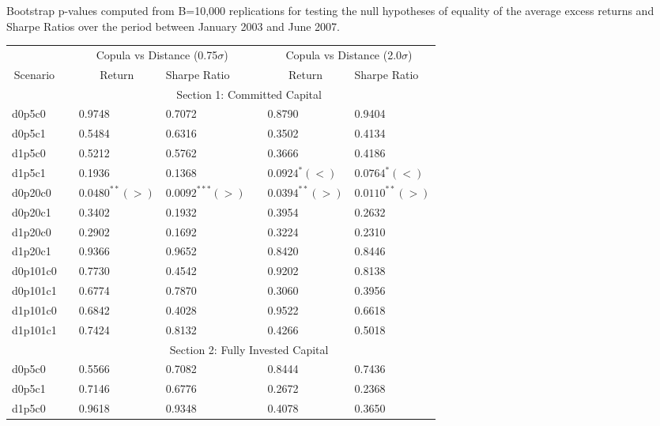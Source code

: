 \documentclass[a4paper]{article}
\begin{document}
	\medskip
	
	\begin{threeparttable}[H]
		\centering \scriptsize
		\caption{Bootstrap p-values computed from B=10,000 replications for testing the null hypotheses of equality of the average excess returns and Sharpe Ratios over the period between January 2003 and June 2007.}
		\begin{tabularx}{\textwidth}{@{\extracolsep{\fill}}lllllll@{}}
			\toprule
			& & \multicolumn{2}{c}{Copula vs Distance (0.75$\sigma$)} & \multicolumn{1}{c}{} & \multicolumn{2}{c}{Copula vs Distance (2.0$\sigma$)} \\
			\cmidrule{3-4}  \cmidrule{6-7}
			\multicolumn{1}{c}{Scenario} & & \multicolumn{1}{c}{Return} & Sharpe Ratio &       & \multicolumn{1}{c}{Return}& Sharpe Ratio \\
			\midrule
			& \multicolumn{6}{c}{Section 1: Committed Capital} \\
			\midrule
			d0p5c0 & & 0.9748 & 0.7072 &       & 0.8790 & 0.9404 \\
			d0p5c1 & & 0.5484 & 0.6316 &       & 0.3502 & 0.4134 \\
			d1p5c0 & & 0.5212 & 0.5762 &       & 0.3666 & 0.4186 \\
			d1p5c1 & & 0.1936 & 0.1368 &       & $0.0924^{*}(<)$ & $0.0764^{*}(<)$ \\
			d0p20c0 & & $0.0480^{**}(>)$ & $0.0092^{***}(>)$ &       & $0.0394^{**}(>)$ & $0.0110^{**}(>)$ \\
			d0p20c1 & & 0.3402 & 0.1932 &       & 0.3954 & 0.2632 \\
			d1p20c0 & & 0.2902 & 0.1692 &       & 0.3224 & 0.2310 \\
			d1p20c1 & & 0.9366 & 0.9652 &       & 0.8420 & 0.8446 \\
			d0p101c0 & & 0.7730 & 0.4542 &       & 0.9202 & 0.8138 \\
			d0p101c1 & & 0.6774 & 0.7870 &       & 0.3060 & 0.3956 \\
			d1p101c0 & & 0.6842 & 0.4028 &       & 0.9522 & 0.6618 \\
			d1p101c1 & & 0.7424 & 0.8132 &       & 0.4266 & 0.5018 \\
			\midrule
			& \multicolumn{6}{c}{Section 2:  Fully Invested Capital } \\
			\midrule
			d0p5c0 & & 0.5566 & 0.7082 &       & 0.8444 & 0.7436 \\
			d0p5c1 & & 0.7146 & 0.6776 &       & 0.2672 & 0.2368 \\
			d1p5c0 & & 0.9618 & 0.9348 &       & 0.4078 & 0.3650 \\

\end{tabularx}
\end{threeparttable}
\end{document}
